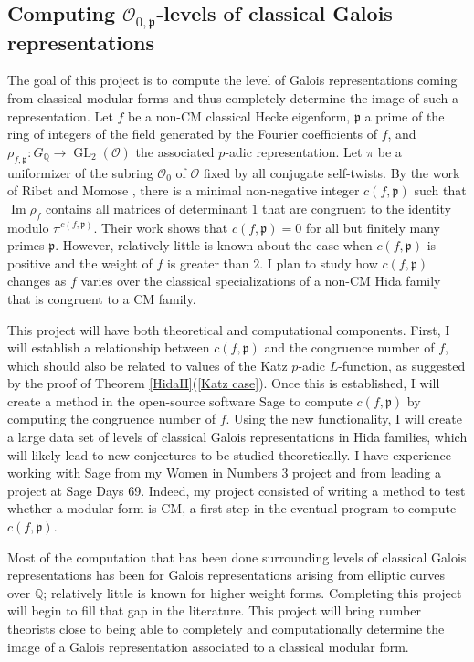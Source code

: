 \documentclass[11pt]{amsart}
\theoremstyle{definition}
\theoremstyle{remark}
\def\OK{\mathcal{O}}
\def\p{\mathfrak{p}}
\def\Q{\mathbb{Q}}
\DeclareMathOperator{\GL}{GL}
\DeclareMathOperator{\im}{Im}
\begin{document}
\subsection*{Computing $\OK_{0, \p}$-levels of classical Galois representations}\label{classical images}
The goal of this project is to compute the level of Galois representations coming from classical modular forms and thus completely determine the image of such a representation.  Let $f$ be a non-CM classical Hecke eigenform, $\p$ a prime of the ring of integers of the field generated by the Fourier coefficients of $f$, and $\rho_{f, \p} : G_\Q \to \GL_2(\OK)$ the associated $p$-adic representation.  Let $\pi$ be a uniformizer of the subring $\OK_0$ of $\OK$ fixed by all conjugate self-twists.  By the work of Ribet \cite{Ribet83} and Momose \cite{Momose81}, there is a minimal non-negative integer $c(f, \p)$ such that $\im \rho_f$ contains all matrices of determinant $1$ that are congruent to the identity modulo $\pi^{c(f, \p)}$.  Their work shows that $c(f, \p) = 0$ for all but finitely many primes $\p$.  However, relatively little is known about the case when $c(f, \p)$ is positive and the weight of $f$ is greater than $2$.  I plan to study how $c(f, \p)$ changes as $f$ varies over the classical specializations of a non-CM Hida family that is congruent to a CM family.

This project will have both theoretical and computational components.  First, I will establish a relationship between $c(f, \p)$ and the congruence number of $f$, which should also be related to values of the Katz $p$-adic $L$-function, as suggested by the proof of Theorem \ref{HidaII}(\ref{Katz case}).  Once this is established, I will create a method in the open-source software Sage \cite{SAGE} to compute $c(f, \p)$ by computing the congruence number of $f$.  Using the new functionality, I will create a large  data set of levels of classical Galois representations in Hida families, which will likely lead to new conjectures to be studied theoretically.  I have experience working with Sage from my Women in Numbers 3 project \cite{BCLMN15} and from leading a project at Sage Days 69.  Indeed, my project consisted of writing a method to test whether a modular form is CM, a first step in the eventual program to compute $c(f, \p)$.

Most of the computation that has been done surrounding levels of classical Galois representations has been for Galois representations arising from elliptic curves over $\Q$; relatively little is known for higher weight forms.  Completing this project will begin to fill that gap in the literature.  This project will bring number theorists close to being able to completely and computationally determine the image of a Galois representation associated to a classical modular form.
\end{document}
